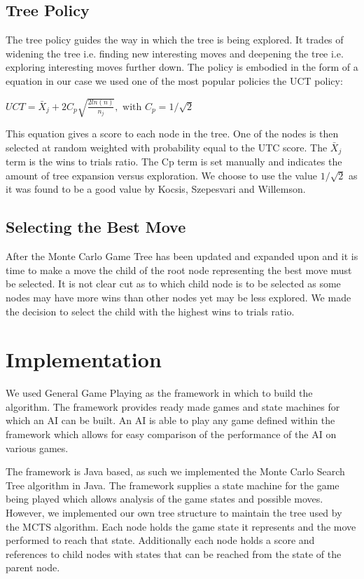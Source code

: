 \documentclass[compressed,final,notitlepage,narroweqnarray,inline,twoside,]{ieee}
\begin{document}
\subsection{Tree Policy}
The tree policy guides the way in which the tree is being explored. It trades of widening the tree i.e. finding new interesting moves and deepening the tree i.e. exploring interesting moves further down. The policy is embodied in the form of a equation in our case we used one of the most popular policies the UCT policy:

$UCT = \bar{X}_j+2C_p \sqrt{\frac{2 ln(n)}{n_j}}, \mbox{ with } C_p = 1/\sqrt{2}$

This equation gives a score to each node in the tree. One of the nodes is then selected at random weighted with probability equal to the UTC score. The $\bar{X}_j$ term is the wins to trials ratio. The Cp term is set manually and indicates the amount of tree expansion versus exploration. We choose to use the value $1/\sqrt{2}$ as it was found to be a good value by Kocsis, Szepesvari and Willemson\cite{UCT}.

\subsection{Selecting the Best Move}
After the Monte Carlo Game Tree has been updated and expanded upon and it is time to make a move the child of the root node representing the best move must be selected. It is not clear cut as to which child node is to be selected as some nodes may have more wins than other nodes yet may be less explored. We made the decision to select the child with the highest wins to trials ratio.

\section{Implementation}
We used General Game Playing \cite{GGP} as the framework in which to build the algorithm. The framework provides ready made games and state machines for which an AI can be built. An AI is able to play any game defined within the framework which allows for easy comparison of the performance of the AI on various games.

The framework is Java based, as such we implemented the Monte Carlo Search Tree algorithm in Java. The framework supplies a state machine for the game being played which allows analysis of the game states and possible moves. However, we implemented our own tree structure to maintain the tree used by the MCTS algorithm. Each node holds the game state it represents and the move performed to reach that state. Additionally each node holds a score and references to child nodes with states that can be reached from the state of the parent node.
\end{document}
